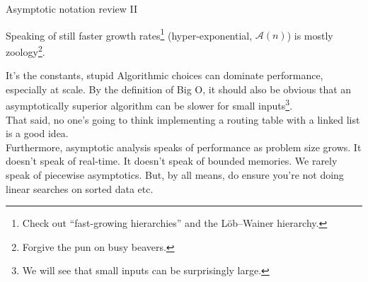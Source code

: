 \documentclass[mathserif,xcolor={dvipsnames,table}]{beamer}
\begin{document}
\begin{frame}{Asymptotic notation review II}
\scriptsize{
\begin{center}
\end{center}
\vfill
Speaking of still faster growth rates\footnote{\scriptsize{Check out ``fast-growing hierarchies'' and the L\"ob–Wainer hierarchy.}} (hyper-exponential, $\mathcal{A}(n)$)
 is mostly zoology\footnote{\scriptsize{Forgive the pun on busy beavers.}}.
}
\end{frame}

\begin{frame}{It's the constants, stupid}
Algorithmic choices can dominate performance, especially at scale. By the
definition of Big O, it should also be obvious that an asymptotically superior
algorithm can be slower for small inputs\footnote{We will see that small inputs can be surprisingly large.}.\\
\vfill
That said, no one's going to think implementing a routing table with a linked list is a good idea.\\
\vfill
Furthermore, asymptotic analysis speaks of performance as problem size grows.
It doesn't speak of real-time. It doesn't speak of bounded memories.
We rarely speak of piecewise asymptotics.
\vfill
But, by all means, do ensure you're not doing linear searches on sorted data etc.
\end{frame}
\end{document}
